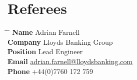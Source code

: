\documentclass[10pt]{article} %
\begin{document}




\section{Referees}

\parbox{0.5\textwidth}{ %
\begin{tabbing}
\hspace{2.75cm} \= \hspace{4cm} \= \kill %
{\bf Name} \> Adrian Farnell \\ %
{\bf Company} \> Lloyds Banking Group \\ %
{\bf Position} \> Lead Engineer \\ %
{\bf Email} \> \href{mailto:adrian.farnell@lloydsbanking.com}{adrian.farnell@lloydsbanking.com} \\ %
{\bf Phone} \> +44(0)7760 172 759 %
\end{tabbing}}
\hfill %

\end{document}
